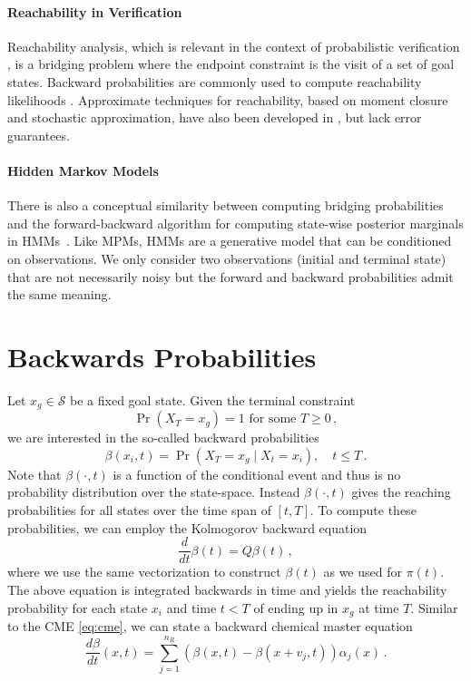 \paragraph{Reachability in Verification}
Reachability analysis, which is relevant in the context of probabilistic verification \cite{bortolussi2014stochastic,neupane2019stamina}, is a bridging problem where the endpoint constraint is the visit of a set of goal states.
Backward probabilities are commonly used to compute reachability likelihoods \cite{amparore2013backward,zapreev2006safe}.
Approximate techniques for reachability, based on moment closure and stochastic approximation, have also been developed in \cite{bortolussi2014stochastic,Bortolussi18infcomp}, but lack error guarantees. 

\paragraph{Hidden Markov Models}
There is also a conceptual similarity between computing bridging probabilities and the forward-backward algorithm for computing state-wise posterior marginals in \acfp{HMM}~\cite{rabiner1986introduction}. Like \acp{MPM}, \acp{HMM} are a generative model that can be conditioned on observations. We only consider two observations (initial and terminal state) that are not necessarily noisy but the forward and backward probabilities admit the same meaning.


\section{Backwards Probabilities}
Let $x_g\in \mathcal{S}$ be a fixed goal state.
Given the terminal constraint 
\begin{equation*}
	\Pr(X_T=x_g)=1 \text{ for some }T\geq 0\,,
\end{equation*}
we are interested in the so-called backward probabilities
\begin{equation}\label{eq:back_probs}
\beta(x_i, t) = \Pr(X_T=x_g\mid X_t = x_i),\quad t\leq T\,.
\end{equation}
Note that $\beta(\cdot, t)$ is a function of the conditional event and thus is no probability distribution over the state-space.
Instead $\beta(\cdot, t)$ gives the reaching probabilities for all states over the
time span of $[t, T]$.
To compute these probabilities, we can employ the Kolmogorov backward equation
\begin{equation}\label{eq:backward}
\frac{d}{dt}\beta(t) = Q\beta(t)\,,
\end{equation}
where we use the same vectorization to construct $\beta(t)$ as we used
for $\pi(t)$.
The above equation is integrated backwards in time and yields the reachability
probability for each state $x_i$ and time $t<T$ of ending up in $x_g$ at time $T$.
Similar to the CME \eqref{eq:cme}, we can state a backward chemical master equation
\begin{equation}\label{eq:bcme}
    \frac{d\beta}{dt}({x}, t) =
    \sum_{j=1}^{n_R}\left(
        \beta( x,t) - \beta( x+ v_j,t)
    \right)\alpha_j({x})\,.
\end{equation}

